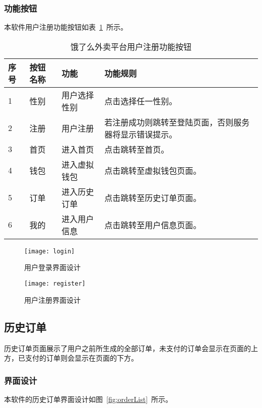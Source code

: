 \subsubsection{功能按钮}
本软件用户注册功能按钮如表~\ref{tab:table11}~所示。
\begin{table}[htbp]
    \caption{饿了么外卖平台用户注册功能按钮}\label{tab:table11}
    \vspace{0.5em}\wuhao
    \begin{tabularx}{\textwidth}{lllX}
    \toprule[1.5pt]
    序号 & 按钮名称 & 功能 & 功能规则 \\ 
    \midrule[1pt]
    1 & 性别 & 用户选择性别 & 点击选择任一性别。 \\
    2 & 注册 & 用户注册 & 若注册成功则跳转至登陆页面，否则服务器将显示错误提示。 \\
    3 & 首页 & 进入首页 & 点击跳转至首页。 \\
    4 & 钱包 & 进入虚拟钱包 & 点击跳转至虚拟钱包页面。 \\
    5 & 订单 & 进入历史订单 & 点击跳转至历史订单页面。 \\
    6 & 我的 & 进入用户信息 & 点击跳转至用户信息页面。 \\
\bottomrule[1.5pt]
\end{tabularx}
\vspace{\baselineskip}
\end{table}
\begin{figure}[htbp]
    \centering
    \begin{minipage}{0.4\textwidth}
    \centering
    \texttt{[image: login]}
    \caption{用户登录界面设计}\label{fig:login}
    \end{minipage}
    \begin{minipage}{0.4\textwidth}
    \centering
    \texttt{[image: register]}
    \caption{用户注册界面设计}\label{fig:register}
    \end{minipage}
    \vspace{\baselineskip}
\end{figure}

\subsection{历史订单}
历史订单页面展示了用户之前所生成的全部订单，未支付的订单会显示在页面的上方，已支付的订单则会显示在页面的下方。
\subsubsection{界面设计}
本软件的历史订单界面设计如图~\ref{fig:orderList}~所示。
